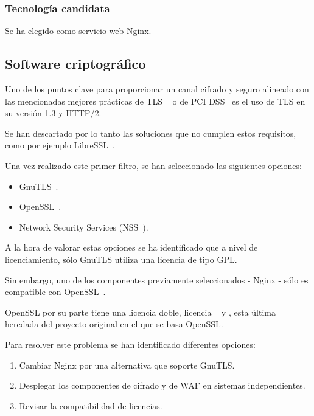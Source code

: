 \subsubsection{Tecnología candidata}
\par Se ha elegido como servicio web Nginx.

\subsection{Software criptográfico}
\par Uno de los puntos clave para proporcionar un canal cifrado y seguro alineado con las mencionadas mejores prácticas de TLS ~\cite{TLSBestPractices} o de PCI DSS~\cite{pcidssrequirements} es el uso de TLS en su versión 1.3 y HTTP/2.
\par Se han descartado por lo tanto las soluciones que no cumplen estos requisitos, como por ejemplo LibreSSL~\cite{libressl}.
\par Una vez realizado este primer filtro, se han seleccionado las siguientes opciones:
\begin{itemize}
  \item GnuTLS~\cite{gnutls}.
  \item OpenSSL~\cite{openssl}.
  \item Network Security Services (NSS~\cite{nss}).
\end{itemize}

\par A la hora de valorar estas opciones se ha identificado que a nivel de licenciamiento, sólo GnuTLS utiliza una licencia de tipo GPL.
\par Sin embargo, uno de los componentes previamente seleccionados - Nginx - sólo es compatible con OpenSSL~\cite{opensslnginx}.
\par OpenSSL por su parte tiene una licencia doble, licencia ~\cite[Apache License 1.0]{apachelicense10} y \cite[licencia SSLeay]{ssleaylicense}, esta última heredada del proyecto original en el que se basa OpenSSL.

\par Para resolver este problema se han identificado diferentes opciones:
\begin{enumerate}
  \item Cambiar Nginx por una alternativa que soporte GnuTLS.
  \item Desplegar los componentes de cifrado y de WAF en sistemas independientes.
  \item Revisar la compatibilidad de licencias.
\end{enumerate}


